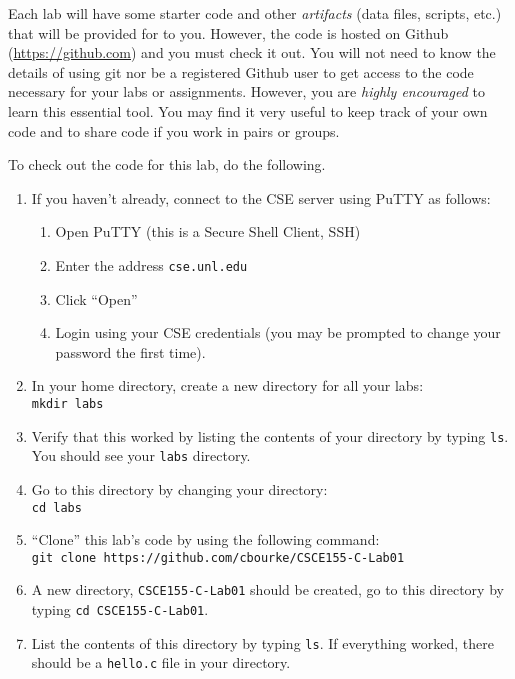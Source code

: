 \documentclass[12pt]{scrartcl}
\begin{document}
Each lab will have some starter code and other \emph{artifacts} (data files, 
scripts, etc.) that will be provided for to you.  However, the code is hosted
on Github (\url{https://github.com}) and you must check it out.  You will not
need to know the details of using git nor be a registered Github user to 
get access to the code necessary for your labs or assignments.  However, 
you are \emph{highly encouraged} to learn this essential tool.  You may find
it very useful to keep track of your own code and to share code if you work
in pairs or groups.  

To check out the code for this lab, do the following.
\begin{enumerate}
  \item If you haven't already, connect to the CSE server using PuTTY as follows:
  \begin{enumerate}
    \item Open PuTTY (this is a Secure Shell Client, SSH)
    \item Enter the address \texttt{cse.unl.edu}
    \item Click ``Open''
    \item Login using your CSE credentials (you may be prompted to change your password the first time).
  \end{enumerate}
  \item In your home directory, create a new directory for all your labs:\\  
  \texttt{mkdir labs}  
  \item Verify that this worked by listing the contents of your directory by
  typing \texttt{ls}.  You should see your \texttt{labs} directory.
   \item Go to this directory by changing your directory:\\
  \texttt{cd labs}
  \item ``Clone'' this lab's code by using the following command:\\
  \texttt{git clone https://github.com/cbourke/CSCE155-C-Lab01}
  \item A new directory, \texttt{CSCE155-C-Lab01} should be created, 
  go to this directory by typing \texttt{cd CSCE155-C-Lab01}.
  \item List the contents of this directory by typing \texttt{ls}.  If
  everything worked, there should be a \texttt{hello.c} file in your
  directory.
\end{enumerate}
\end{document}
